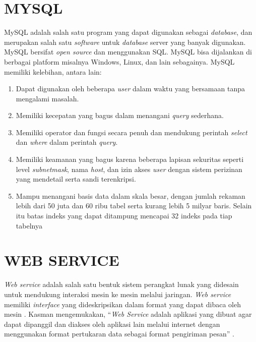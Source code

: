 
\section{\uppercase{MySQL}}
MySQL adalah salah satu program yang dapat digunakan sebagai \textit{database}, dan merupakan salah satu \textit{software} untuk \textit{database} server yang banyak digunakan. MySQL bersifat \textit{open source} dan menggunakan SQL. MySQL bisa dijalankan di berbagai platform misalnya Windows, Linux, dan lain sebagainya. MySQL memiliki kelebihan, antara lain: \citep{orlando2017aplikasi}

\begin{enumerate}
	\item Dapat digunakan oleh beberapa \textit{user} dalam waktu yang bersamaan tanpa mengalami masalah.	
	\item Memiliki kecepatan yang bagus dalam menangani \textit{query} sederhana.
	\item Memiliki operator dan fungsi secara penuh dan mendukung perintah \textit{select} dan \textit{where} dalam perintah \textit{query}.
	\item Memiliki keamanan yang bagus karena beberapa lapisan sekuritas seperti level \textit{subnetmask}, nama \textit{host}, dan izin akses \textit{user} dengan sistem perizinan yang mendetail serta sandi terenkripsi.
	\item Mampu menangani basis data dalam skala besar, dengan jumlah rekaman lebih dari 50 juta dan 60 ribu tabel serta kurang lebih 5 milyar baris. Selain itu batas indeks yang dapat ditampung mencapai 32 indeks pada tiap tabelnya
\end{enumerate}

\section{\uppercase{WEB SERVICE}}
\textit{Web service} adalah salah satu bentuk sistem perangkat lunak yang didesain untuk mendukung interaksi mesin ke mesin melalui jaringan. \textit{Web service} memiliki \textit{interface} yang dideskripsikan dalam format yang dapat dibaca oleh mesin \citep{prabowo2016teknologi}. Kasman mengemukakan, “\textit{Web Service} adalah aplikasi yang dibuat agar dapat dipanggil dan diakses oleh aplikasi lain melalui internet dengan menggunakan format pertukaran data sebagai format pengiriman pesan” \citep{kasman2015}.

